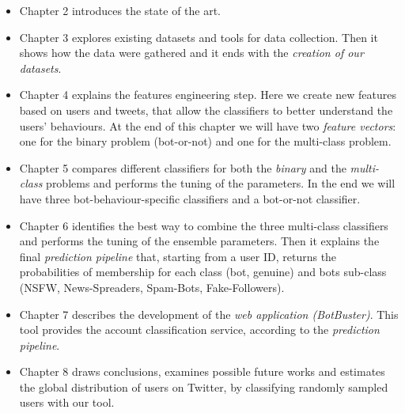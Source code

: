 \begin{itemize}
\item[\PencilRight] Chapter 2 introduces the state of the art.

\item[\PencilRight] Chapter 3 explores existing datasets and tools for data collection. Then it shows how the data were gathered and it ends with the \emph{creation of our datasets}.

\item[\PencilRight] Chapter 4 explains the features engineering step. Here we create new features based on users and tweets, that allow the classifiers to better understand the users' behaviours. At the end of this chapter we will have two \emph{feature vectors}: one for the binary problem (bot-or-not) and one for the multi-class problem.

\item[\PencilRight] Chapter 5 compares different classifiers for both the \emph{binary} and the \emph{multi-class} problems and performs the tuning of the parameters. In the end we will have three bot-behaviour-specific classifiers and a bot-or-not classifier.

\item[\PencilRight] Chapter 6 identifies the best way to combine the three multi-class classifiers and performs the tuning of the ensemble parameters. Then it explains the final \emph{prediction pipeline} that, starting from a user ID, returns the probabilities of membership for each class (bot, genuine) and bots sub-class (NSFW, News-Spreaders, Spam-Bots, Fake-Followers).

\item[\PencilRight] Chapter 7 describes the development of the \emph{web application (BotBuster)}. This tool provides the account classification service, according to the \emph{prediction pipeline}.

\item[\PencilRight] Chapter 8 draws conclusions, examines possible future works and estimates the global distribution of users on Twitter, by classifying randomly sampled users with our tool.


\end{itemize}

